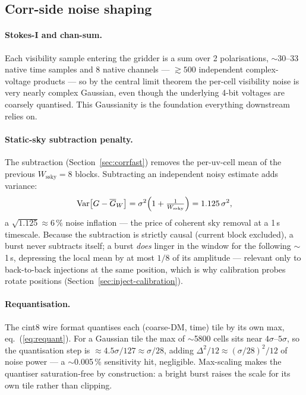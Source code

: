 \documentclass[11pt,a4paper]{article}
\newcommand{\codeword}[1]{\text{\ttfamily\small\detokenize{#1}}}
\begin{document}
\subsection{Corr-side noise shaping}

\paragraph{Stokes-I and chan-sum.}  Each visibility sample entering
the gridder is a sum over 2 polarisations, $\sim$30--33 native time
samples and 8 native channels --- $\gtrsim 500$ independent
complex-voltage products --- so by the central limit theorem the
per-cell visibility noise is very nearly complex Gaussian, even
though the underlying 4-bit voltages are coarsely quantised.  This
Gaussianity is the foundation everything downstream relies on.

\paragraph{Static-sky subtraction penalty.}  The
\codeword{StaticSkyMean} subtraction (Section~\ref{sec:corrfast})
removes the per-uv-cell mean of the previous $W_\mathrm{ssky}=8$
blocks.  Subtracting an independent noisy estimate adds variance:
\[
   \mathrm{Var}\bigl[G - \overline{G}_{W}\bigr]
   = \sigma^2\Bigl(1 + \tfrac{1}{W_\mathrm{ssky}}\Bigr)
   = 1.125\,\sigma^2,
\]
a $\sqrt{1.125}\approx 6\,\%$ noise inflation --- the price of
coherent sky removal at a 1\,s timescale.  Because the subtraction
is strictly causal (current block excluded), a burst never subtracts
itself; a burst \emph{does} linger in the window for the following
$\sim$1\,s, depressing the local mean by at most $1/8$ of its
amplitude --- relevant only to back-to-back injections at the same
position, which is why calibration probes rotate positions
(Section~\ref{sec:inject-calibration}).

\paragraph{Requantisation.}  The cint8 wire format quantises each
(coarse-DM, time) tile by its own max, eq.~(\ref{eq:requant}).
For a Gaussian tile the max of $\sim$5800 cells sits near
$4\sigma$--$5\sigma$, so the quantisation step is
$\approx 4.5\sigma/127 \approx \sigma/28$, adding
$\Delta^2/12 \approx (\sigma/28)^2/12$ of noise power ---
a $\sim$0.005\,\% sensitivity hit, negligible.  Max-scaling makes
the quantiser saturation-free by construction: a bright burst
raises the scale for its own tile rather than clipping.
\end{document}

